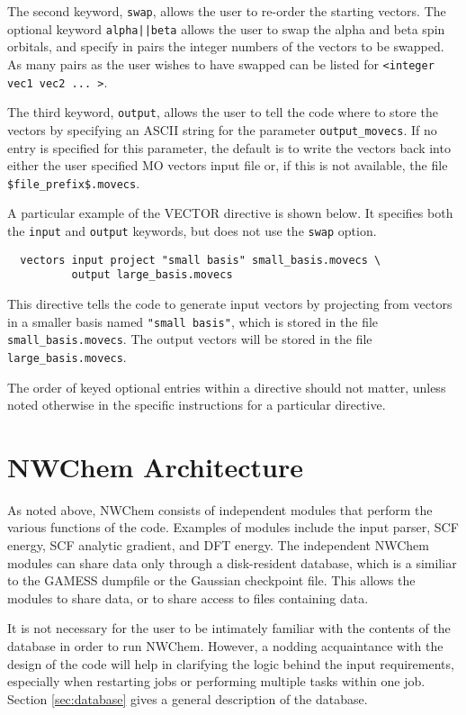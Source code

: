 The second keyword, \verb+swap+, allows the user to re-order the
starting vectors.  The optional keyword \verb+alpha||beta+ allows the
user to swap the alpha and beta spin orbitals, and specify in pairs
the integer numbers of the vectors to be swapped.  As many pairs as
the user wishes to have swapped can be listed for {\tt <integer vec1
vec2 ... >}.

The third keyword, \verb+output+, allows the user to tell the code
where to store the vectors by specifying an ASCII string for the
parameter {\tt output\_movecs}.  If no entry is specified for this
parameter, the default is to write the vectors back into either the user
specified MO vectors input file or, if this is not available, the file
\verb+$file_prefix$.movecs+.

A particular example of the VECTOR directive is shown below.  It specifies
both the \verb+input+ and \verb+output+ keywords, but does not use the 
\verb+swap+ option.

\begin{verbatim}
  vectors input project "small basis" small_basis.movecs \
          output large_basis.movecs
\end{verbatim}

This directive tells the code to generate input vectors by projecting
from vectors in a smaller basis named \verb+"small basis"+, which is
stored in the file \verb+small_basis.movecs+.  The output vectors will be
stored in the file \verb+large_basis.movecs+.

The order of keyed optional entries within a directive should not matter,
unless noted otherwise in the specific instructions for a particular
directive.

\section{NWChem Architecture}
\label{sec:arch}

As noted above, NWChem consists of independent modules that perform
the various functions of the code.  Examples of modules include the
input parser, SCF energy, SCF analytic gradient, and DFT energy.  The
independent NWChem modules can share data only through a disk-resident
database, which is a similiar to the GAMESS dumpfile or the Gaussian
checkpoint file.  This allows the modules to share data, or to share
access to files containing data.

It is not necessary for the user to be intimately familiar with the
contents of the database in order to run NWChem.  However, a nodding
acquaintance with the design of the code will help in clarifying the
logic behind the input requirements, especially when restarting jobs
or performing multiple tasks within one job.  Section
\ref{sec:database} gives a general description of the database.

